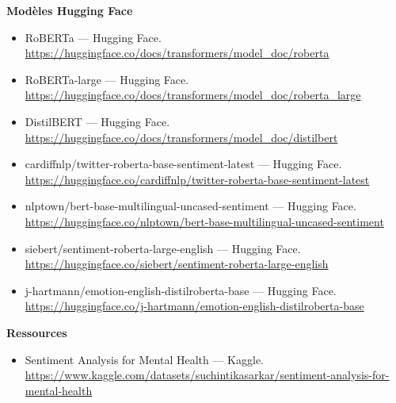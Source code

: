 \documentclass[12pt,a4paper]{article}
\begin{document}
\textbf{Modèles Hugging Face}
\begin{itemize}[leftmargin=1.5cm]
  \item RoBERTa — Hugging Face. 
    \url{https://huggingface.co/docs/transformers/model_doc/roberta}
  
  \item RoBERTa-large — Hugging Face. 
    \url{https://huggingface.co/docs/transformers/model_doc/roberta_large}

  \item DistilBERT — Hugging Face. 
    \url{https://huggingface.co/docs/transformers/model_doc/distilbert}

  \item cardiffnlp/twitter-roberta-base-sentiment-latest — Hugging Face.
    \url{https://huggingface.co/cardiffnlp/twitter-roberta-base-sentiment-latest}

  \item nlptown/bert-base-multilingual-uncased-sentiment — Hugging Face.
    \url{https://huggingface.co/nlptown/bert-base-multilingual-uncased-sentiment}

  \item siebert/sentiment-roberta-large-english — Hugging Face.
    \url{https://huggingface.co/siebert/sentiment-roberta-large-english}

  \item j-hartmann/emotion-english-distilroberta-base — Hugging Face.
    \url{https://huggingface.co/j-hartmann/emotion-english-distilroberta-base}
\end{itemize}

\textbf{Ressources}
\begin{itemize}[leftmargin=1.5cm]
    \item Sentiment Analysis for Mental Health — Kaggle.
    \url{https://www.kaggle.com/datasets/suchintikasarkar/sentiment-analysis-for-mental-health}
\end{itemize}
\end{document}
